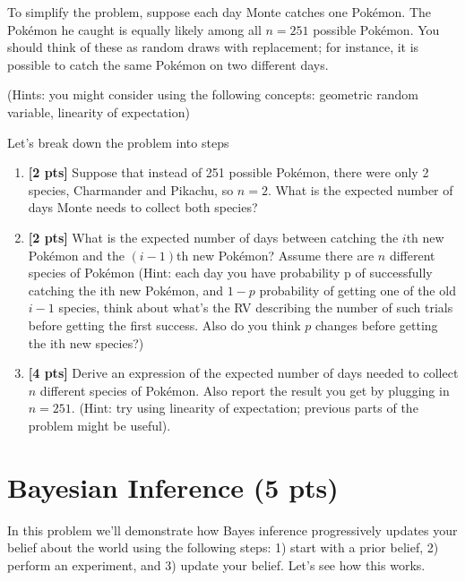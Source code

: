 \documentclass{article}
\newenvironment{soln}{
	\leavevmode\color{blue}\ignorespaces
}{}
\begin{document}
To simplify the problem, suppose each day Monte catches one
Pok{\'e}mon. The Pok{\'e}mon he caught is equally likely among all $n = 251$
possible Pok{\'e}mon. You should think of these as random draws with replacement; for instance, it is possible to catch the same Pok{\'e}mon on two different days.

(Hints: you might consider using the following concepts: geometric
random variable, linearity of expectation)

Let's break down the problem into steps
\begin{enumerate}[1) ]
\item \textbf{[2 pts]} Suppose that instead of 251 possible Pok{\'e}mon, there were only 2 species, Charmander and Pikachu, so $n = 2$. What is the
  expected number of days Monte needs to collect both species?

  \begin{soln}

  \end{soln}
  
\item \textbf{[2 pts]} What is the expected number of days between catching the $i$th new
  Pok{\'e}mon and the $(i - 1)$th new Pok{\'e}mon? Assume there are $n$
  different species of Pok{\'e}mon (Hint: each day you have probability p of successfully catching the ith new Pok{\'e}mon, and $1 - p$ probability of getting one of the old $i - 1$ species, think about what's the RV describing the number of such trials before getting the first success. Also do you think $p$ changes before getting the ith new species?)

  \begin{soln}

  \end{soln}
  
\item \textbf{[4 pts]} Derive an expression of the expected number of days needed to
  collect $n$ different species of Pok{\'e}mon. Also report the result you get by plugging in $n = 251$. (Hint: try using linearity of expectation; previous parts of the problem might be useful).

  \begin{soln}
    
  \end{soln}

\end{enumerate}

\newpage

\section{Bayesian Inference (5 pts)}
In this problem we'll demonstrate how Bayes inference
progressively updates your belief about the world using the following steps: 1) start with a prior belief, 2) perform an
experiment, and 3) update your belief. Let's see how this works.
\end{document}
